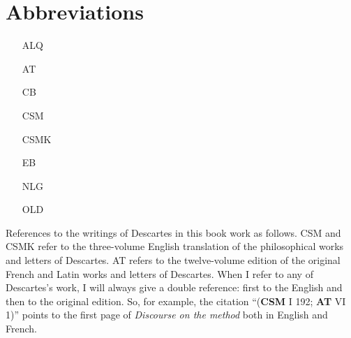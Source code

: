 \chapter{Abbreviations}

\begin{itemize}
    \item[ALQ] 
    \item[AT] 
    \item[CB] 
    \item[CSM] 
    \item[CSMK] 
    \item[EB] 
    \item[NLG] 
    \item[OLD] 
\end{itemize}

References to the writings of Descartes in this book work as follows. CSM and CSMK refer to the three-volume English translation of the philosophical works and letters of Descartes. AT refers to the twelve-volume edition of the original French and Latin works and letters of Descartes. When I refer to any of Descartes's work, I will always give a double reference: first to the English and then to the original edition. So, for example, the citation ``(\textbf{CSM} I 192; \textbf{AT} VI 1)'' points to the first page of \textit{Discourse on the method} both in English and French.

